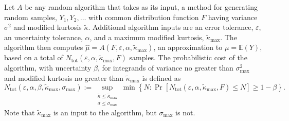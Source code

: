 \documentclass[graybox]{svmult}
\newcommand\e{\mathbb{E}}
\newcommand{\Prob}{\Pr}
\newcommand{\hmu}{\hat{\mu}}
\newcommand{\tkappa}{\tilde{\kappa}}
\begin{document}
Let $A$ be any random algorithm that takes as its input, a method for generating random samples, $Y_1, Y_2, \ldots $ with common distribution function $F$ having variance $\sigma^2$ and modified kurtosis $\tkappa$.  Additional algorithm inputs are an error tolerance, $\varepsilon$, an uncertainty tolerance, $\alpha$, and a maximum modified kurtosis, $\tkappa_{\max}$.  The algorithm then computes $\hmu=A(F,\varepsilon,\alpha,\tkappa_{\max})$, an approximation to $\mu=\e(Y)$, based on a total of $N_{\text{tot}}(\varepsilon,\alpha,\tkappa_{\max},F)$ samples. The probabilistic cost of the algorithm, with uncertainty $\beta$, for integrands of variance no greater than $\sigma^2_{\max}$ and modified kurtosis no greater than $\tkappa_{\max}$ is defined as 
\begin{equation}
N_{\text{tot}}(\varepsilon,\alpha,\beta,\tkappa_{\max},\sigma_{\max})
:= \sup_{\substack{\tkappa \le \tkappa_{\max} \\ \sigma \le \sigma_{\max}} } \min\left\{N : \Prob[N_{\text{tot}}(\varepsilon,\alpha,\tkappa_{\max},F) \le N] \ge 1-\beta  \right \}.
\end{equation}
Note that $\tkappa_{\max}$ is an input to the algorithm, but $\sigma_{\max}$ is not.
\end{document}

